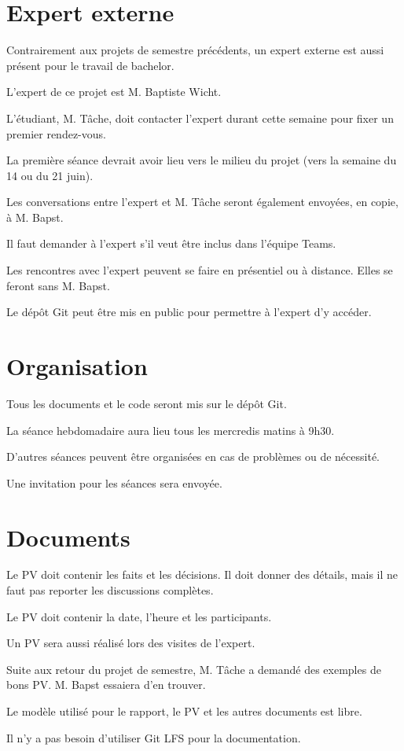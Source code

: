 \documentclass[11pt]{meetingmins}
\begin{document}
\section{Expert externe}
\begin{hiddenitems}
    \item Contrairement aux projets de semestre précédents, un expert externe est aussi présent pour le travail de bachelor.
    \item L'expert de ce projet est M. Baptiste Wicht.
    \item L'étudiant, M. Tâche, doit contacter l'expert durant cette semaine pour fixer un premier rendez-vous.
    \item La première séance devrait avoir lieu vers le milieu du projet (vers la semaine du 14 ou du 21 juin).
    \item Les conversations entre l'expert et M. Tâche seront également envoyées, en copie, à M. Bapst.
    \item Il faut demander à l'expert s'il veut être inclus dans l'équipe Teams.
    \item Les rencontres avec l'expert peuvent se faire en présentiel ou à distance. Elles se feront sans M. Bapst.
    \item Le dépôt Git peut être mis en public pour permettre à l'expert d'y accéder.
\end{hiddenitems}

\section{Organisation}
\begin{hiddenitems}
    \item Tous les documents et le code seront mis sur le dépôt Git.
    \item La séance hebdomadaire aura lieu tous les mercredis matins à 9h30.
    \item D'autres séances peuvent être organisées en cas de problèmes ou de nécessité.
    \item Une invitation pour les séances sera envoyée.
\end{hiddenitems}

\section{Documents}
\begin{hiddenitems}
    \item Le PV doit contenir les faits et les décisions. Il doit donner des détails, mais il ne faut pas reporter les discussions complètes.
    \item Le PV doit contenir la date, l'heure et les participants.
    \item Un PV sera aussi réalisé lors des visites de l'expert.
    \item Suite aux retour du projet de semestre, M. Tâche a demandé des exemples de bons PV. M. Bapst essaiera d'en trouver.
    \item Le modèle utilisé pour le rapport, le PV et les autres documents est libre.
    \item Il n'y a pas besoin d'utiliser Git LFS pour la documentation.
\end{hiddenitems}
\end{document}
